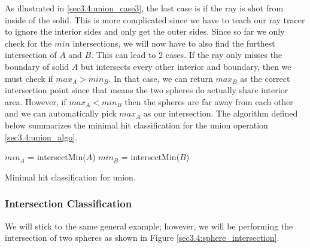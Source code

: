 \documentclass[a4paper,11pt,oneside]{article}
\begin{document}
As illustrated in \ref{sec3.4:union_case3}, the last case is if the ray is shot from inside of the solid. This is more complicated since we have to teach our ray tracer to ignore the interior sides and only get the outer sides. Since so far we only check for the $min$ intersections, we will now have to also find the furthest intersection of $A$ and $B$. This can lead to 2 cases. If the ray only misses the boundary of solid $A$ but intersects every other interior and boundary, then we must check if $max_A > min_B$. In that case, we can return $max_B$ as the correct intersection point since that means the two spheres do actually share interior area. However, if $max_A < min_B$ then the spheres are far away from each other and we can automatically pick $max_A$ as our intersection. The algorithm defined below summarizes the minimal hit classification for the union operation \ref{sec3.4:union_algo}. 

\begin{algorithm}
	\SetAlgoLined
	$min_A$ = intersectMin($A$)\;
	$min_B$ = intersectMin($B$)\;
	\caption{Minimal hit classification for union.}
	\label{sec3.4:union_algo}
\end{algorithm}

\subsubsection{Intersection Classification}

We will stick to the same general example; however, we will be performing the intersection of two spheres as shown in Figure \ref{sec3.4:sphere_intersection}.
\end{document}
